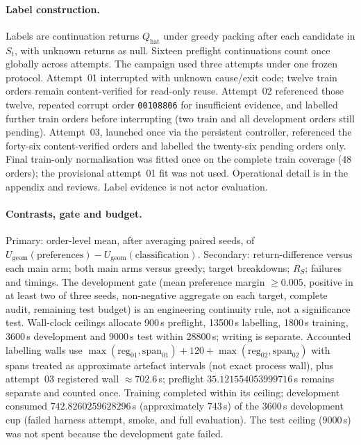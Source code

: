 \paragraph{Label construction.}
Labels are continuation returns $Q_{\mathrm{hat}}$ under greedy packing after each
candidate in $S_t$, with unknown returns as null. Sixteen preflight continuations
count once globally across attempts. The campaign used three attempts under one
frozen protocol. Attempt~01 interrupted with unknown cause/exit code; twelve
train orders remain content-verified for read-only reuse. Attempt~02 referenced
those twelve, repeated corrupt order \texttt{00108806} for insufficient evidence,
and labelled further train orders before interrupting (two train and all
development orders still pending). Attempt~03, launched once via the persistent
controller, referenced the forty-six content-verified orders and labelled the
twenty-six pending orders only. Final train-only normalisation was fitted once
on the complete train coverage ($48$ orders); the provisional attempt~01 fit was
not used. Operational detail is in the appendix and reviews. Label evidence is
not actor evaluation.

\paragraph{Contrasts, gate and budget.}
Primary: order-level mean, after averaging paired seeds, of
$U_{\mathrm{geom}}(\mathrm{preferences})-U_{\mathrm{geom}}(\mathrm{classification})$.
Secondary: return-difference versus each main arm; both main arms versus greedy;
target breakdowns; $R_S$; failures and timings. The development gate
(mean preference margin $\ge 0.005$, positive in at least two of three seeds,
non-negative aggregate on each target, complete audit, remaining test budget) is
an engineering continuity rule, not a significance test. Wall-clock ceilings
allocate 900\,s preflight, 13500\,s labelling, 1800\,s training, 3600\,s
development and 9000\,s test within 28800\,s; writing is separate. Accounted
labelling walls use
$\max(\mathrm{reg}_{01},\mathrm{span}_{01})+120+\max(\mathrm{reg}_{02},\mathrm{span}_{02})$
with spans treated as approximate artefact intervals (not exact process wall),
plus attempt~03 registered wall $\approx 702.6$\,s; preflight
$35.121554053999716$\,s remains separate and counted once. Training completed
within its ceiling; development consumed $742.8260259628296$\,s
(approximately $743$\,s) of the
$3600$\,s development cup (failed harness attempt, smoke, and full evaluation).
The test ceiling ($9000$\,s) was not spent because the development gate failed.
